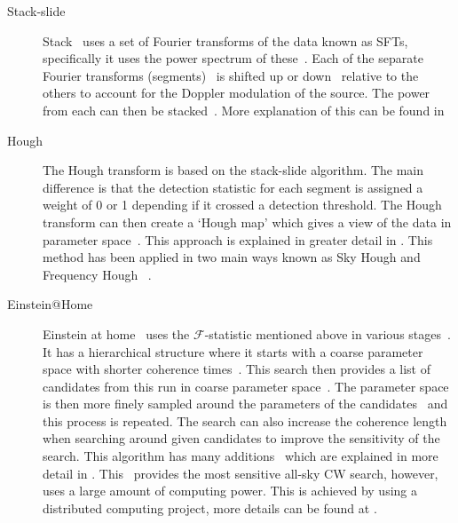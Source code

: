 \begin{description}
	
        \item[Stack-slide] Stack~ uses a set of Fourier
transforms of the data known as \glspl{SFT}, specifically it uses the power
spectrum of these~. Each of the separate
Fourier transforms (segments)~ is shifted up or down~ relative
to the others to account for the Doppler modulation of the source. The
power~ from each can then be stacked~. More explanation of this can be found in
\citep{brady2000SearchingPeriodic, cutler2005ImprovedStackslide}  
	
        \item[Hough] The Hough transform is based on the stack-slide algorithm.
The main difference is that the detection statistic for each segment is
assigned a weight of 0 or 1 depending if it crossed a detection threshold. The
Hough transform can then create a `Hough map' which gives a view of the data in
parameter space~. This approach is
explained in greater detail in
\citep{krishnan2004HoughTransform,antonucci2008DetectionPeriodic}.  This method
has been applied in two main ways known as Sky Hough
\citep{krishnan2004HoughTransform} and Frequency Hough
\citep{antonucci2008DetectionPeriodic,astone2014MethodAllsky}~.
	
        \item[Einstein@Home] Einstein at home~ uses the
$\mathcal{F}$-statistic mentioned above in various stages~. It has a hierarchical
structure where it starts with a coarse parameter space with shorter coherence
times~. This search then
provides a list of candidates from this run in coarse parameter
space~. The parameter space is then more finely sampled around the
parameters of the candidates~ and this process is
repeated.  The search can also increase the coherence length when searching
around given candidates to improve the sensitivity of the search. This
algorithm has many additions~ which are explained in more detail in
\citep{singh2016ResultsAllsky,papa2016HierarchicalFollowup,walsh2016ComparisonMethods}.
This~ provides the most sensitive all-sky \gls{CW} search,
however, uses a large amount of computing power. This is achieved by using a
distributed computing project, more details can be found at
\citep{EinsteinHome}. 
	

\end{description}
